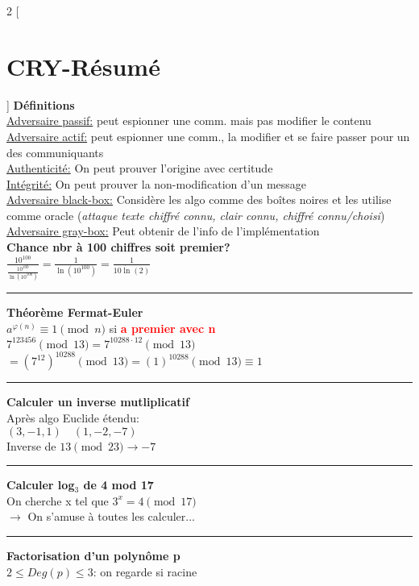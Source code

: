 \documentclass{article}
\title{}
\author{}
\date{}
\begin{document}
\begin{multicols*}{2}
[\section*{CRY-Résumé}]
\textbf{Définitions}\\
\uline{Adversaire passif:} peut espionner une comm. mais pas modifier le contenu\\
\uline{Adversaire actif:} peut espionner une comm., la modifier et se faire passer pour un des communiquants\\
\uline{Authenticité:} On peut prouver l'origine avec certitude\\
\uline{Intégrité:} On peut prouver la non-modification d'un message\\
\uline{Adversaire black-box:} Considère les algo comme des boîtes noires et les utilise comme oracle (\textit{attaque texte chiffré connu, clair connu, chiffré connu/choisi})\\
\uline{Adversaire gray-box:} Peut obtenir de l'info de l'implémentation \\
\textbf{Chance nbr à 100 chiffres soit premier?}\\
$ \frac{10^{100}}{\frac{10^{100}}{\ln(10^{100})}} = \frac{1}{\ln(10^{100})} = \frac{1}{10 \dot \ln(2)} $
\\
\noindent\rule{7cm}{0.5pt}
\textbf{Théorème Fermat-Euler}\\
$ a^{\varphi(n)} \equiv 1 \pmod n$ si \textbf{\textcolor{red}{a premier avec n}}\\
$7^{123456} \pmod{13} = 7^{10288 \cdot 12} \pmod{13}$\\
$= (7^{12})^{10288} \pmod{13} = (1)^{10288} \pmod{13} \equiv 1$\\
\noindent\rule{7cm}{0.5pt}
\textbf{Calculer un inverse mutliplicatif}\\
Après algo Euclide étendu:\\
$(3, -1, 1) \quad (1, -2, -7)$\\
Inverse de $13 \pmod{23} \rightarrow -7$\\
\noindent\rule{7cm}{0.5pt}
\textbf{Calculer log$_{3}$ de 4 mod 17}\\
On cherche x tel que $3^{x} = 4 \pmod{17}$\\
$\rightarrow$ On s'amuse à toutes les calculer...\\
\noindent\rule{7cm}{0.5pt}
\textbf{Factorisation d'un polynôme p}\\
$2 \leq Deg(p) \leq 3$: on regarde si racine\\

\end{multicols*}
\end{document}
